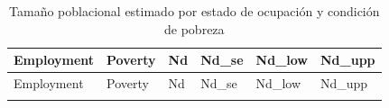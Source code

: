 \documentclass[
  spanish,
  12pt,
]{book}
\begin{document}
\begin{longtable}[]{@{}
  >{\raggedright\arraybackslash}p{}
  >{\centering\arraybackslash}p{}
  >{\centering\arraybackslash}p{}
  >{\centering\arraybackslash}p{}
  >{\centering\arraybackslash}p{}
  >{\centering\arraybackslash}p{}@{}}
\caption{\label{tab:tab-tamano-empleo-pobreza}Tamaño poblacional estimado por estado de ocupación y condición de pobreza}\tabularnewline
\toprule\noalign{}
\begin{minipage}[b]{\linewidth}\raggedright
Employment
\end{minipage} & \begin{minipage}[b]{\linewidth}\centering
Poverty
\end{minipage} & \begin{minipage}[b]{\linewidth}\centering
Nd
\end{minipage} & \begin{minipage}[b]{\linewidth}\centering
Nd\_se
\end{minipage} & \begin{minipage}[b]{\linewidth}\centering
Nd\_low
\end{minipage} & \begin{minipage}[b]{\linewidth}\centering
Nd\_upp
\end{minipage} \\
\midrule\noalign{}
\endfirsthead
\toprule\noalign{}
\begin{minipage}[b]{\linewidth}\raggedright
Employment
\end{minipage} & \begin{minipage}[b]{\linewidth}\centering
Poverty
\end{minipage} & \begin{minipage}[b]{\linewidth}\centering
Nd
\end{minipage} & \begin{minipage}[b]{\linewidth}\centering
Nd\_se
\end{minipage} & \begin{minipage}[b]{\linewidth}\centering
Nd\_low
\end{minipage} & \begin{minipage}[b]{\linewidth}\centering
Nd\_upp
\end{minipage} \\
\midrule\noalign{}

\end{longtable}
\end{document}
